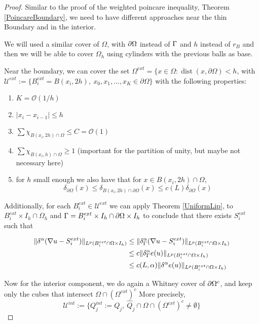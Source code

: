 \begin{proof}
Similar to the proof of the weighted poincare  inequality, Theorem \ref{PoincareBoundary}, we need to have  different approaches near the thin Boundary and in the interior. 

We will used a similar cover of $\Omega$, with $\partial\Omega$ instead of $\Gamma$ and $h$ instead of $r_B$ and then we will be able to cover $\Omega_h$ using cylinders with the previous balls as base.
 
 Near the boundary, we can cover the set $\Omega^{ext}= \{x\in\Omega: \operatorname{dist}(x,\partial\Omega)<h$, with $\mathcal{U}^{ext}:=\{B_i^{ext}=B(x_i,2h),\  x_0,x_1,\ldots,x_K \in \partial\Omega\}$ with the following properties:
\begin{enumerate}
    \item  $K=\mathcal{O}(1/h)$
    \item  $|x_i-x_{i-1}|\leq h$
    \item  $\sum \chi_{B(x_i,2h)\cap \Omega}\leq C=\mathcal{O}(1)$
    \item  $\sum \chi_{B(x_i,h)\cap \Omega}\geq 1$ (important for the partition of unity, but maybe not necessary here)
    \item  for $h$ small enough we also have that for $x\in B(x_i,2h)\cap \Omega$, $$\delta_{\partial\Omega}(x)\leq\delta_{B(x_i,2h)\cap \partial\Omega}(x)\leq c(L)\delta_{\partial\Omega}(x)$$
\end{enumerate}

Additionally, for each $B^{ext}_i\in\mathcal{U}^{ext}$ we can apply Theorem \ref{UniformLip}, to $B^{ext}_i\times I_h\cap\Omega_h$ and $\Gamma = B^{ext}_i\times I_h \cap \partial\Omega\times I_h$ to conclude that there exists $S_i^{ext}$ such that

\begin{align*}
\|\delta^\alpha(\nabla u -S^{ext}_i)\|_{L^p(B^{ext}_i\cap\Omega\times I_h)}&\leq\|\delta_\Gamma^\alpha(\nabla u -S^{ext}_i)\|_{L^p(B^{ext}_i\cap\Omega\times I_h)}\\
&\leq c
\|\delta_\Gamma^\alpha e(u)\|_{L^p(B^{ext}_i\cap\Omega\times I_h)}
\\
&\leq c(L,\alpha) \|\delta^\alpha e(u)\|_{L^p(B^{ext}_i\cap\Omega\times I_h)}
\end{align*}

Now for the interior component, we do again a Whitney cover of $\partial\Omega^c$, and keep only the cubes that intersect $\Omega\cap(\Omega^{ext})^c$ More precisely, 
$$\mathcal{U}^{int}:= \{Q_j^{int}:=Q_j,\ \hat{Q}_j\cap\Omega\cap(\Omega^{ext})^c\neq \emptyset \}$$



\end{proof}
